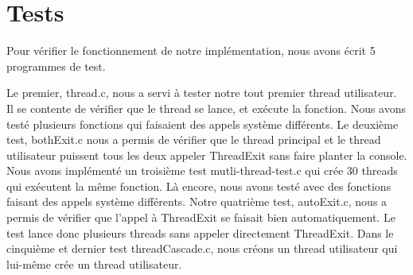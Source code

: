 \documentclass[10pt]{article}
\begin{document}
\section {Tests}

Pour vérifier le fonctionnement de notre implémentation, nous avons écrit 5 programmes de test.

Le premier, \textcolor{vert2}{thread.c}, nous a servi à tester notre tout premier thread utilisateur. Il se contente de vérifier que le thread se lance, et exécute la fonction. Nous avons testé plusieurs fonctions qui faisaient des appels système différents.
\newline
Le deuxième test, \textcolor{vert2}{bothExit.c} nous a permis de vérifier que le thread principal et le thread utilisateur puissent tous les deux appeler \textcolor{blue2}{ThreadExit} sans faire planter la console.
\newline
Nous avons implémenté un troisième test \textcolor{vert2}{mutli-thread-test.c} qui crée 30 threads qui exécutent la même fonction. Là encore, nous avons testé avec des fonctions faisant des appels système différents.
\newline
Notre quatrième test, \textcolor{vert2}{autoExit.c}, nous a permis de vérifier que l'appel à \textcolor{blue2}{ThreadExit} se faisait bien automatiquement. Le test lance donc plusieurs threads sans appeler directement \textcolor{blue2}{ThreadExit}.
\newline
Dans le cinquième et dernier test \textcolor{vert2}{threadCascade.c}, nous créons un thread utilisateur qui lui-même crée un thread utilisateur.
\end{document}
